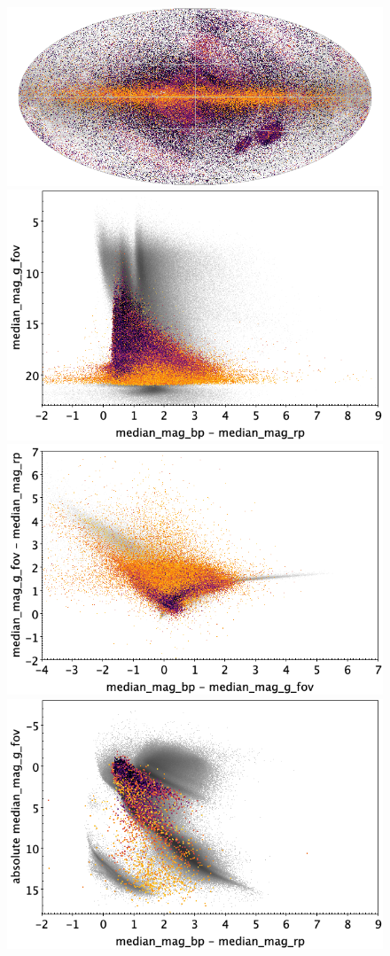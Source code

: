 \documentclass[longauth]{aa}
\begin{document}
\begin{appendix}
\begin{figure}
\centering
{}
\includegraphics[width=0.6\hsize]{figures/appendix/RR_cls_sky.png} 
 \\ %
\vspace{4mm}
 \includegraphics[width=0.45\hsize]{figures/appendix/RR_cls_cm.png}  %
\hspace{2mm}
 \includegraphics[width=0.45\hsize]{figures/appendix/RR_cls_cc.png} \\ %
\vspace{4mm}
 \includegraphics[width=0.45\hsize]{figures/appendix/RR_cls_cam.png}  %

\end{figure}
\end{appendix}
\end{document}
